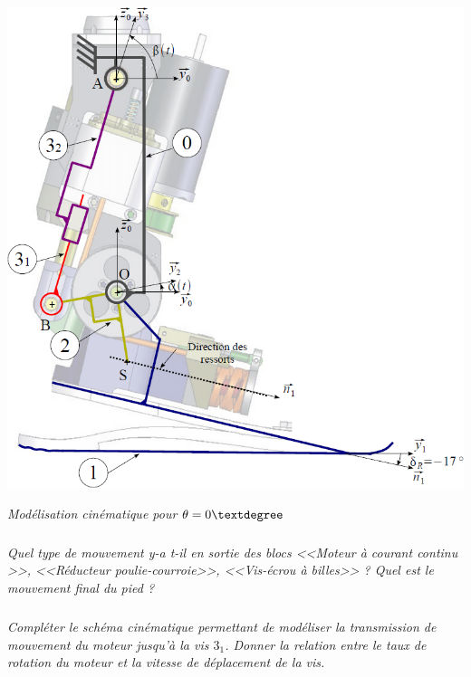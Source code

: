 \documentclass[10pt]{article}
\newif\ifprof
\begin{document}
\begin{minipage}[c]{.43\linewidth}
\begin{center}
\includegraphics[width=\textwidth]{images/prot_03}

\textit{Modélisation cinématique pour $\theta=0\textdegree$}
\end{center}
\end{minipage}
\fi


\subparagraph{}
\textit{Quel type de mouvement y-a t-il en sortie des blocs <<Moteur à courant continu >>, <<Réducteur poulie-courroie>>, <<Vis-écrou à billes>> ? Quel est le mouvement final du pied ?} 

\ifprof
\begin{corrige}
Le mouvement du pied est une rotation d'axe $\vz{}$. La rotation du moteur entraîne un réducteur poulies-courroie. La poulie réceptrice entraîne un écrou qui, grâce à une liaison hélicoïdale, va entrainer la transmission de la vis. Le système $\{0, 2, 3_1, 3_2\}$ va transformer la translation de la vis 3 en rotation du pied 2. 
\end{corrige}
\else
\fi

\subparagraph{}
\textit{Compléter le schéma cinématique permettant de modéliser la transmission de mouvement du moteur jusqu'à la vis $3_1$. Donner la relation entre le taux de rotation du moteur et la vitesse de déplacement de la vis.}
\end{document}
